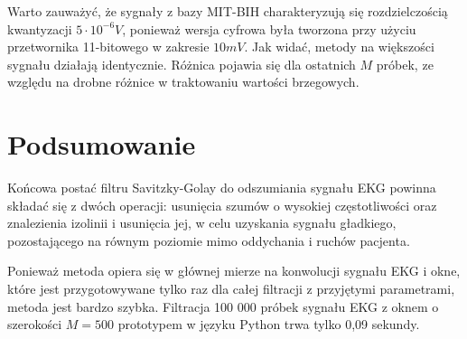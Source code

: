 Warto zauważyć, że sygnały z bazy MIT-BIH charakteryzują się rozdzielczością kwantyzacji $5 \cdot 10^{-6} V$, ponieważ wersja cyfrowa była tworzona przy użyciu przetwornika 11-bitowego w zakresie $10 mV$. Jak widać, metody na większości sygnału działają identycznie. Różnica pojawia się dla ostatnich $M$ próbek, ze względu na drobne różnice w traktowaniu wartości brzegowych.

\section{Podsumowanie}

Końcowa postać filtru Savitzky-Golay do odszumiania sygnału EKG powinna składać się z dwóch operacji: usunięcia szumów o wysokiej częstotliwości oraz znalezienia izolinii i usunięcia jej, w celu uzyskania sygnału gładkiego, pozostającego na równym poziomie mimo oddychania i ruchów pacjenta.

Ponieważ metoda opiera się w głównej mierze na konwolucji sygnału EKG i okne, które jest przygotowywane tylko raz dla całej filtracji z przyjętymi parametrami, metoda jest bardzo szybka. Filtracja 100 000 próbek sygnału EKG z oknem o szerokości $M=500$ prototypem w języku Python trwa tylko 0,09 sekundy.

